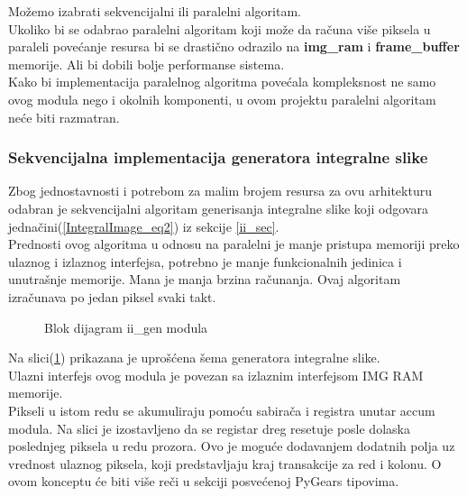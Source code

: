 Možemo izabrati sekvencijalni ili paralelni algoritam. \\
Ukoliko bi se odabrao paralelni algoritam koji može da računa više piksela u paraleli
povećanje resursa bi se drastično odrazilo na \textbf{img\_ram} i \textbf{frame\_buffer} memorije.
Ali bi dobili bolje performanse sistema. \\
Kako bi implementacija paralelnog algoritma povećala kompleksnost ne samo ovog
modula nego i okolnih komponenti, u ovom projektu paralelni algoritam neće biti razmatran.

\subsubsection{Sekvencijalna implementacija generatora integralne slike}\label{ii_seq_alg_sec}

Zbog jednostavnosti i potrebom za malim brojem resursa za ovu arhitekturu
odabran je sekvencijalni algoritam generisanja integralne slike koji odgovara
jednačini(\ref{IntegralImage_eq2}) iz sekcije \ref{ii_sec}.\\

Prednosti ovog algoritma u odnosu na paralelni je manje pristupa memoriji preko
ulaznog i izlaznog interfejsa, potrebno je manje funkcionalnih jedinica i
unutrašnje memorije.
Mana je manja brzina računanja.
Ovaj algoritam izračunava po jedan piksel svaki takt. \\

\begin{figure}[H]
  \centering
  \resizebox{\textwidth}{!}{%
    
    }
\caption{Blok dijagram ii\_gen modula}
\label{ii_gen}
\end{figure}

Na slici(\ref{ii_gen}) prikazana je uprošćena šema generatora integralne slike.
\\

Ulazni interfejs ovog modula je povezan sa izlaznim interfejsom IMG RAM memorije.
\\

Pikseli u istom redu se akumuliraju pomoću sabirača i registra unutar accum modula.
Na slici je izostavljeno da se registar dreg resetuje posle dolaska poslednjeg
piksela u redu prozora.
Ovo je moguće dodavanjem dodatnih polja uz vrednost ulaznog piksela, koji
predstavljaju kraj transakcije za red i kolonu.
O ovom konceptu će biti više reči u sekciji posvećenoj PyGears tipovima. \\


